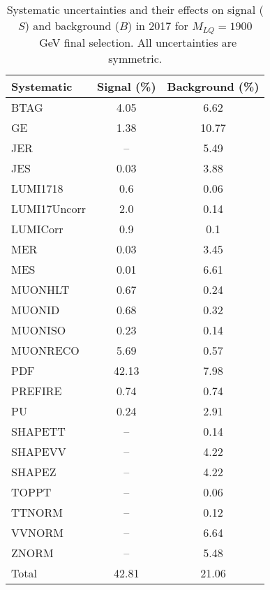 \begin{table}[htbp]
\begin{center}
\caption{Systematic uncertainties and their effects on signal ($S$) and background ($B$) in 2017 for $M_{LQ}=1900$~GeV final selection. All uncertainties are symmetric.}
\begin{tabular}{lcc}
\hline\hline
Systematic & Signal (\%) & Background (\%) \\ \hline 
BTAG & 4.05 & 6.62\\ 
GE & 1.38 & 10.77\\ 
JER & -- & 5.49\\ 
JES & 0.03 & 3.88\\ 
LUMI1718 & 0.6 & 0.06\\ 
LUMI17Uncorr & 2.0 & 0.14\\ 
LUMICorr & 0.9 & 0.1\\ 
MER & 0.03 & 3.45\\ 
MES & 0.01 & 6.61\\ 
MUONHLT & 0.67 & 0.24\\ 
MUONID & 0.68 & 0.32\\ 
MUONISO & 0.23 & 0.14\\ 
MUONRECO & 5.69 & 0.57\\ 
PDF & 42.13 & 7.98\\ 
PREFIRE & 0.74 & 0.74\\ 
PU & 0.24 & 2.91\\ 
SHAPETT & -- & 0.14\\ 
SHAPEVV & -- & 4.22\\ 
SHAPEZ & -- & 4.22\\ 
TOPPT & -- & 0.06\\ 
TTNORM & -- & 0.12\\ 
VVNORM & -- & 6.64\\ 
ZNORM & -- & 5.48\\ 
Total & 42.81 & 21.06\\ \hline \hline
\end{tabular}
\label{tab:SysUncertainties_uujj_1900}
\end{center}
\end{table}

